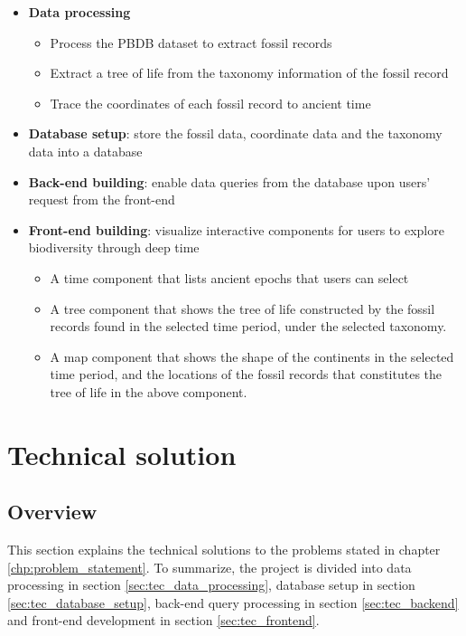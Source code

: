 \documentclass[11pt, a4paper,oneside,chapterprefix=false]{scrbook}
\begin{document}
\begin{itemize}
	\item \textbf{Data processing}
	\begin{itemize}
		\item Process the PBDB dataset to extract fossil records 
		\item Extract a tree of life from the taxonomy information of the fossil record 
		\item Trace the coordinates of each fossil record to ancient time
	\end{itemize} 
	\item \textbf{Database setup}: store the fossil data, coordinate data and the taxonomy data into a database
	\item \textbf{Back-end building}: enable data queries from the database upon users' request from the front-end 
	\item \textbf{Front-end building}: visualize interactive components for users to explore biodiversity through deep time
	\begin{itemize}
		\item A time component that lists ancient epochs that users can select
		\item A tree component that shows the tree of life constructed by the fossil records found in the selected time period, under the selected taxonomy. 
		\item A map component that shows the shape of the continents in the selected time period, and the locations of the fossil records that constitutes the tree of life in the above component.    
	\end{itemize} 
\end{itemize} 

\chapter{Technical solution} \label{chp:technical_solution}
\section{Overview}\label{sec:tec_overview}
This section explains the technical solutions to the problems stated in chapter \ref{chp:problem_statement}. To summarize, the project is divided into data processing in section \ref{sec:tec_data_processing}, database setup in section \ref{sec:tec_database_setup}, back-end query processing in section \ref{sec:tec_backend} and front-end development in section \ref{sec:tec_frontend}.
\end{document}
